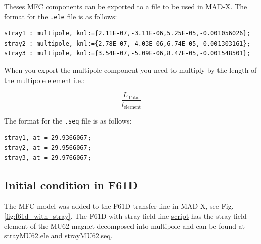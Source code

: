 Theses MFC components can be exported to a file to be used in MAD-X. The format for the \texttt{.ele} file is as follows:

\begin{lstlisting}
stray1 : multipole, knl:={2.11E-07,-3.11E-06,5.25E-05,-0.001056026};
stray2 : multipole, knl:={2.78E-07,-4.03E-06,6.74E-05,-0.001303161};
stray3 : multipole, knl:={3.54E-07,-5.09E-06,8.47E-05,-0.001548501};
\end{lstlisting}

When you export the multipole component you need to multiply by the length of the multipole element i.e.:

\[
\frac{L_{\text{Total}}}{l_{\text{element}}}
\]

The format for the \texttt{.seq} file is as follows:

\begin{lstlisting}
stray1, at = 29.9366067;
stray2, at = 29.9566067;
stray3, at = 29.9766067;
\end{lstlisting}

\subsection{Initial condition in F61D}

The MFC model was added to the F61D transfer line in MAD-X, see Fig. \ref{fig:f61d_with_stray}. The F61D with stray field line \href{https://gitlab.cern.ch/eljohnso/acc-models-tls-eliott-fork/-/blob/c6cbcafacca274000d2bfc501f39cf711375de90/ps_extraction/east-fast-extraction/f61d_with_stray/F61D_with_stray.ipynb}{script} has the stray field element of the MU62 magnet decomposed into multipole and can be found at \href{https://gitlab.cern.ch/eljohnso/acc-models-tls-eliott-fork/-/blob/c6cbcafacca274000d2bfc501f39cf711375de90/ps_extraction/east-fast-extraction/f61d_with_stray/strayMU62.ele}{strayMU62.ele} and \href{https://gitlab.cern.ch/eljohnso/acc-models-tls-eliott-fork/-/blob/c6cbcafacca274000d2bfc501f39cf711375de90/ps_extraction/east-fast-extraction/f61d_with_stray/strayMU62.seq}{strayMU62.seq}.

